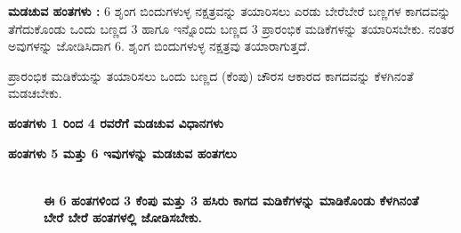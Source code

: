 \noindent
\textbf{ಮಡಚುವ ಹಂತಗಳು :} 6 ಶೃಂಗ ಬಿಂದುಗಳುಳ್ಳ ನಕ್ಷತ್ರವನ್ನು ತಯಾರಿಸಲು ಎರಡು ಬೇರೆ\break ಬೇರೆ ಬಣ್ಣಗಳ ಕಾಗದವನ್ನು ತೆಗೆದುಕೊಂಡು ಒಂದು ಬಣ್ಣದ 3 ಹಾಗೂ ಇನ್ನೊಂದು ಬಣ್ಣದ 3 ಪ್ರಾರಂಭಿಕ ಮಡಿಕೆಗಳನ್ನು ತಯಾರಿಸಬೇಕು. ನಂತರ ಅವುಗಳನ್ನು ಜೋಡಿಸಿದಾಗ 6. ಶೃಂಗ ಬಿಂದುಗಳುಳ್ಳ ನಕ್ಷತ್ರವು ತಯಾರಾಗುತ್ತದೆ. 
\begin{figure}[H]
\end{figure}

ಪ್ರಾರಂಭಿಕ ಮಡಿಕೆಯನ್ನು ತಯಾರಿಸಲು ಒಂದು ಬಣ್ಣದ (ಕೆಂಪು) ಚೌರಸ ಆಕಾರದ ಕಾಗದವನ್ನು ಕೆಳಗಿನಂತೆ ಮಡಚಬೇಕು.

\textbf{ಹಂತಗಳು 1 ರಿಂದ 4 ರವರೆಗೆ ಮಡಚುವ ವಿಧಾನಗಳು}
\begin{figure}[H]
\end{figure}

\textbf{ಹಂತಗಳು 5 ಮತ್ತು 6 ಇವುಗಳನ್ನು ಮಡಚುವ ಹಂತಗಲು}
\begin{figure}[H]
\\
\textbf{ಈ 6 ಹಂತಗಳಿಂದ 3 ಕೆಂಪು ಮತ್ತು 3 ಹಸಿರು ಕಾಗದ ಮಡಿಕೆಗಳನ್ನು ಮಾಡಿಕೊಂಡು ಕೆಳಗಿನಂತೆ ಬೇರೆ ಬೇರೆ ಹಂತಗಳಲ್ಲಿ ಜೋಡಿಸಬೇಕು.}
\end{figure}
 
